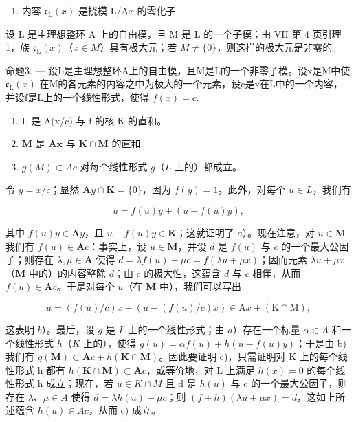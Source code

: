 \begin{enumerate}
\def\labelenumi{\arabic{enumi})}
\setcounter{enumi}{1}
\tightlist
\item
  内容 \(\mathfrak{c}_{\mathrm{L}}(x)\) 是挠模 \(\mathrm{L} / \mathrm{A}x\) 的零化子.
\end{enumerate}

设 L 是主理想整环 A 上的自由模，且 M 是 L 的一个子模；由 VII 第 4 页引理 1，族 \(\mathfrak{c}_{\mathrm{L}}(x)\)（\(x \in M\)）具有极大元；若 \(M \neq \{0\}\)，则这样的极大元是非零的。

命题3. --- 设L是主理想整环A上的自由模，且M是L的一个非零子模。设x是M中使 \(\mathfrak{c}_{\mathrm{L}}(x)\) 在M的各元素的内容之中为极大的一个元素，设c是x在L中的一个内容，并设f是L上的一个线性形式，使得 \(f(x) = c\).

\begin{enumerate}
\def\labelenumi{\alph{enumi})}
\item
  L 是 A(x/c) 与 f 的核 K 的直和。
\item
  \(\mathbf{M}\) 是 \(\mathbf{A}\mathbf{x}\) 与 \(\mathbf{K} \cap \mathbf{M}\) 的直和.
\item
  \(g(M) \subset Ac\) 对每个线性形式 \(g\)（\(L\) 上的）都成立。
\end{enumerate}

令 \(y = x / c\)；显然 \(\mathbf{A}y \cap \mathbf{K} = \{0\}\)，因为 \(f(y) = 1\)。此外，对每个 \(u \in L\)，我们有

\[
u = f (u) y + (u - f (u) y),
\]

其中 \(f(u) y \in \mathbf{A}y\)，且 \(u - f(u)y \in \mathbf{K}\)；这就证明了 \(a\)）。现在注意，对 \(u \in \mathbf{M}\) 我们有 \(f(u) \in \mathbf{A}c\)：事实上，设 \(u \in \mathbf{M}\)，并设 \(d\) 是 \(f(u)\) 与 \(c\) 的一个最大公因子；则存在 \(\lambda, \mu \in \mathbf{A}\) 使得 \(d = \lambda f(u) + \mu c = f(\lambda u + \mu x)\)；因而元素 \(\lambda u + \mu x\)（\(\mathbf{M}\) 中的）的内容整除 \(d\)；由 \(c\) 的极大性，这蕴含 \(d\) 与 \(c\) 相伴，从而 \(f(u) \in \mathbf{A}c\)。于是对每个 \(u\)（在 \(\mathbf{M}\) 中），我们可以写出

\[
u = (f (u) / c) x + (u - (f (u) / c) x) \in \mathrm{A} x + (\mathrm{K} \cap \mathrm{M}),
\]

这表明 \(b\)）。最后，设 \(g\) 是 \(L\) 上的一个线性形式；由 \(a\)）存在一个标量 \(\alpha \in A\) 和一个线性形式 \(h\)（\(K\) 上的），使得 \(g(u) = \alpha f(u) + h(u - f(u)y)\)；于是由 b) 我们有 \(g(\mathbf{M}) \subset \mathbf{A}c + h(\mathbf{K} \cap \mathbf{M})\)。因此要证明 c)，只需证明对 K 上的每个线性形式 h 都有 \(h(\mathbf{K} \cap \mathbf{M}) \subset \mathbf{A}c\)，或等价地，对 L 上满足 \(h(x) = 0\) 的每个线性形式 h 成立；现在，若 \(u \in K \cap M\) 且 d 是 \(h(u)\) 与 c 的一个最大公因子，则存在 \(\lambda\)、\(\mu \in A\) 使得 \(d = \lambda h(u) + \mu c\)；则 \((f + h)(\lambda u + \mu x) = d\)，这如上所述蕴含 \(h(u) \in Ac\)，从而 c) 成立。

